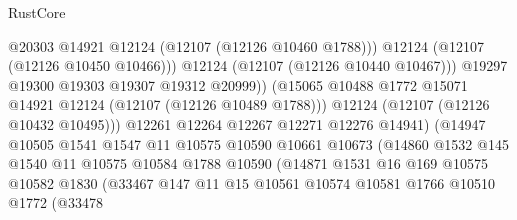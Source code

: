 \begin{lexlean}{RustCore}
\begin{coremodule}
                                        @20303
                                        @14921
                                        @12124
                                        (@12107 (@12126 @10460 @1788)))
                                      @12124
                                      (@12107 (@12126 @10450 @10466)))
                                    @12124
                                    (@12107 (@12126 @10440 @10467)))
                                  @19297
                                  @19300
                                  @19303
                                  @19307
                                  @19312
                                  @20999))
                              (@15065
                                @10488
                                @1772
                                @15071
                                @14921
                                @12124
                                (@12107 (@12126 @10489 @1788)))
                              @12124
                              (@12107 (@12126 @10432 @10495)))
                            @12261
                            @12264
                            @12267
                            @12271
                            @12276
                            @14941)
                          (@14947
                            @10505
                            @1541
                            @1547
                            @11
                            @10575
                            @10590
                            @10661
                            @10673
                            (@14860
                              @1532
                              @145
                              @1540
                              @11
                              @10575
                              @10584
                              @1788
                              @10590
                              (@14871
                                @1531
                                @16
                                @169
                                @10575
                                @10582
                                @1830
                                (@33467
                                  @147
                                  @11
                                  @15
                                  @10561
                                  @10574
                                  @10581
                                  @1766
                                  @10510
                                  @1772
                                  (@33478

\end{coremodule}
\end{lexlean}

